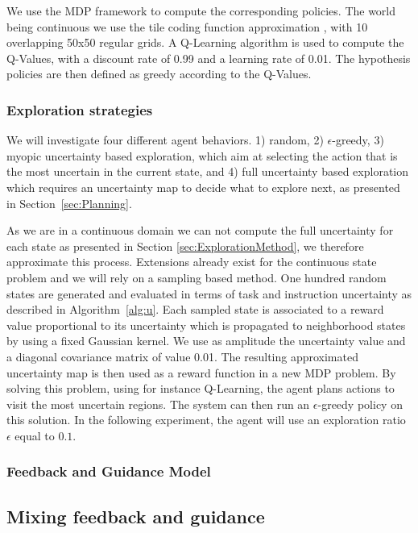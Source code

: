 We use the MDP framework to compute the corresponding policies. The world being continuous we use the tile coding function approximation \cite{sutton1998reinforcement}, with 10 overlapping 50x50 regular grids. %
A Q-Learning algorithm \cite{watkins1992q} is used to compute the Q-Values, with a discount rate of 0.99 and a learning rate of 0.01. The hypothesis policies are then defined as greedy according to the Q-Values.

\subsubsection{Exploration strategies}

We will investigate four different agent behaviors. 1) random, 2) $\epsilon$-greedy, 3) myopic uncertainty based exploration, which aim at selecting the action that is the most uncertain in the current state, and 4) full uncertainty based exploration which requires an uncertainty map to decide what to explore next, as presented in Section~\ref{sec:Planning}. 

As we are in a continuous domain we can not compute the full uncertainty for each state as presented in Section \ref{sec:ExplorationMethod}, we therefore approximate this process. Extensions already exist for the continuous state problem \cite{nouri2010dimension,Hester13aamas} and we will rely on a sampling based method. One hundred random states are generated and evaluated in terms of task and instruction uncertainty as described in Algorithm~\ref{alg:u}. Each sampled state is associated to a reward value proportional to its uncertainty which is propagated to neighborhood states by using a fixed Gaussian kernel. We use as amplitude the uncertainty value and a diagonal covariance matrix of value 0.01. The resulting approximated uncertainty map is then used as a reward function in a new MDP problem. By solving this problem, using for instance Q-Learning, the agent plans actions to visit the most uncertain regions. The system can then run an $\epsilon$-greedy policy on this solution. In the following experiment, the agent will use an exploration ratio $\epsilon$ equal to $0.1$.

\subsubsection{Feedback and Guidance Model}
\label{sec:advancedModel}


\subsection{Mixing feedback and guidance}
\label{sec:mixing}

